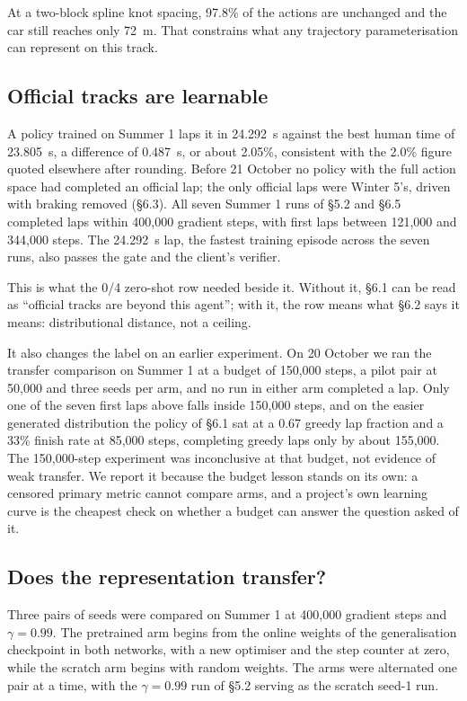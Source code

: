 \documentclass[11pt]{article}
\begin{document}
At a two-block spline knot spacing, 97.8\% of the actions are unchanged and the car still reaches only 72~m. That constrains what any trajectory parameterisation can represent on this track.

\subsection{Official tracks are learnable}

A policy trained on Summer 1 laps it in 24.292~s against the best human time of 23.805~s, a difference of 0.487~s, or about 2.05\%, consistent with the 2.0\% figure quoted elsewhere after rounding. Before 21 October no policy with the full action space had completed an official lap; the only official laps were Winter 5's, driven with braking removed (\S6.3). All seven Summer 1 runs of \S5.2 and \S6.5 completed laps within 400,000 gradient steps, with first laps between 121,000 and 344,000 steps. The 24.292~s lap, the fastest training episode across the seven runs, also passes the gate and the client's verifier.

This is what the 0/4 zero-shot row needed beside it. Without it, \S6.1 can be read as ``official tracks are beyond this agent''; with it, the row means what \S6.2 says it means: distributional distance, not a ceiling.

It also changes the label on an earlier experiment. On 20 October we ran the transfer comparison on Summer 1 at a budget of 150,000 steps, a pilot pair at 50,000 and three seeds per arm, and no run in either arm completed a lap. Only one of the seven first laps above falls inside 150,000 steps, and on the easier generated distribution the policy of \S6.1 sat at a 0.67 greedy lap fraction and a 33\% finish rate at 85,000 steps, completing greedy laps only by about 155,000. The 150,000-step experiment was inconclusive at that budget, not evidence of weak transfer. We report it because the budget lesson stands on its own: a censored primary metric cannot compare arms, and a project's own learning curve is the cheapest check on whether a budget can answer the question asked of it.

\subsection{Does the representation transfer?}

Three pairs of seeds were compared on Summer 1 at 400,000 gradient steps and $\gamma = 0.99$. The pretrained arm begins from the online weights of the generalisation checkpoint in both networks, with a new optimiser and the step counter at zero, while the scratch arm begins with random weights. The arms were alternated one pair at a time, with the $\gamma = 0.99$ run of \S5.2 serving as the scratch seed-1 run.
\end{document}
